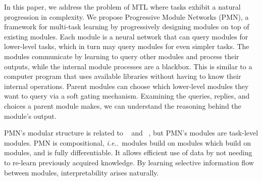 \documentclass{article}
\makeatletter
\DeclareRobustCommand\onedot{\futurelet\@let@token\@onedot}
\def\@onedot{\ifx\@let@token.\else.\null\fi\xspace}
\def\ie{\emph{i.e}\onedot} \def\Ie{\emph{I.e}\onedot}
\makeatother
\begin{document}

In this paper, we address the problem of MTL where tasks exhibit a natural progression in complexity.
We propose Progressive Module Networks (PMN), a framework for multi-task learning by progressively designing modules on top of existing modules.
Each module is a neural network that can query modules for lower-level tasks, which in turn may query modules for even simpler tasks.
The modules communicate by learning to query other modules and process their outputs, while the internal module processes are a blackbox.
This is similar to a computer program that uses available libraries without having to know their internal operations.
Parent modules can choose which lower-level modules they want to query via a soft gating mechanism. %
Examining the queries, replies, and choices a parent module makes, we can understand the reasoning behind the module's output.

PMN's modular structure is related to ~\citet{andreas16} and ~\citet{hu17}, but PMN's modules are task-level modules.
PMN is compositional, \ie~modules build on modules which build on modules, and is fully differentiable.
It allows efficient use of data by not needing to re-learn previously acquired knowledge. %
By learning selective information flow between modules, interpretability arises naturally.
\end{document}

